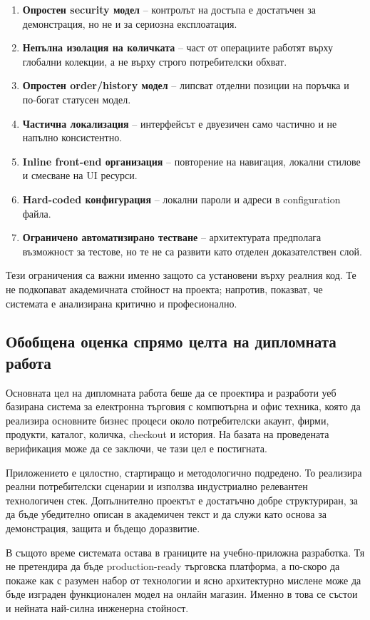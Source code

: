 \begin{enumerate}[leftmargin=*]
    \item \textbf{Опростен security модел} -- контролът на достъпа е достатъчен за демонстрация, но не и за сериозна експлоатация.
    \item \textbf{Непълна изолация на количката} -- част от операциите работят върху глобални колекции, а не върху строго потребителски обхват.
    \item \textbf{Опростен order/history модел} -- липсват отделни позиции на поръчка и по-богат статусен модел.
    \item \textbf{Частична локализация} -- интерфейсът е двуезичен само частично и не напълно консистентно.
    \item \textbf{Inline front-end организация} -- повторение на навигация, локални стилове и смесване на UI ресурси.
    \item \textbf{Hard-coded конфигурация} -- локални пароли и адреси в configuration файла.
    \item \textbf{Ограничено автоматизирано тестване} -- архитектурата предполага възможност за тестове, но те не са развити като отделен доказателствен слой.
\end{enumerate}

Тези ограничения са важни именно защото са установени върху реалния код. Те не подкопават академичната стойност на проекта; напротив, показват, че системата е анализирана критично и професионално.

\subsection{Обобщена оценка спрямо целта на дипломната работа}

Основната цел на дипломната работа беше да се проектира и разработи уеб базирана система за електронна търговия с компютърна и офис техника, която да реализира основните бизнес процеси около потребителски акаунт, фирми, продукти, каталог, количка, checkout и история. На базата на проведената верификация може да се заключи, че тази цел е постигната.

Приложението е цялостно, стартиращо и методологично подредено. То реализира реални потребителски сценарии и използва индустриално релевантен технологичен стек. Допълнително проектът е достатъчно добре структуриран, за да бъде убедително описан в академичен текст и да служи като основа за демонстрация, защита и бъдещо доразвитие.

В същото време системата остава в границите на учебно-приложна разработка. Тя не претендира да бъде production-ready търговска платформа, а по-скоро да покаже как с разумен набор от технологии и ясно архитектурно мислене може да бъде изграден функционален модел на онлайн магазин. Именно в това се състои и нейната най-силна инженерна стойност.

